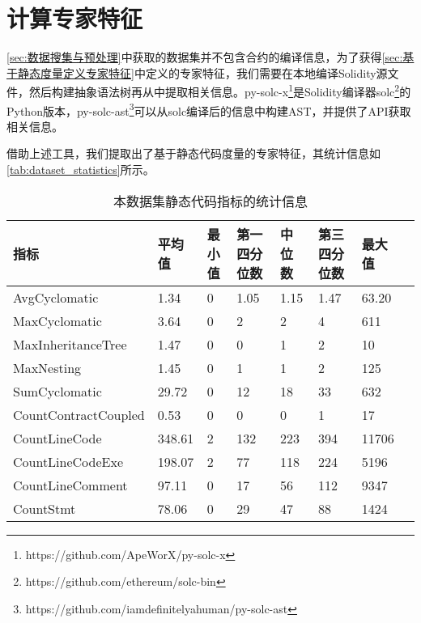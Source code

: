 \section{计算专家特征}
\label{sec:计算专家特征}
\autoref{sec:数据搜集与预处理}中获取的数据集并不包含合约的编译信息，为了获得\autoref{sec:基于静态度量定义专家特征}中定义的专家特征，我们需要在本地编译Solidity源文件，然后构建抽象语法树再从中提取相关信息。py-solc-x\footnote{https://github.com/ApeWorX/py-solc-x}是Solidity编译器solc\footnote{https://github.com/ethereum/solc-bin}的Python版本，py-solc-ast\footnote{https://github.com/iamdefinitelyahuman/py-solc-ast}可以从solc编译后的信息中构建AST，并提供了API获取相关信息。

借助上述工具，我们提取出了基于静态代码度量的专家特征，其统计信息如\autoref{tab:dataset_statistics}所示。
\begin{table}[htbp]
    \caption{\label{tab:dataset_statistics}本数据集静态代码指标的统计信息}
    \small
    \renewcommand{\arraystretch}{1.3}
    \begin{tabularx}{\linewidth}
        {p{3cm}<{\centering}X<{\centering}p{1.5cm}<{\centering}X<{\centering}X<{\centering}X<{\centering}X<{\centering}X<{\centering}}
    \hline
    \textbf{指标}                    & \textbf{平均值}   & \textbf{最小值} & \textbf{第一四分位数} & \textbf{中位数}  & \textbf{第三四分位数} & \textbf{最大值}   \\ \hline
    AvgCyclomatic         & 1.34        & 0   & 1.05   & 1.15 & 1.47   & 63.20 \\
    MaxCyclomatic         & 3.64        & 0   & 2      & 2    & 4      & 611   \\
    MaxInheritanceTree    & 1.47        & 0   & 0      & 1    & 2      & 10    \\
    MaxNesting            & 1.45        & 0   & 1      & 1    & 2      & 125   \\
    SumCyclomatic         & 29.72      & 0   & 12     & 18   & 33     & 632   \\
    CountContractCoupled  & 0.53        & 0   & 0      & 0    & 1      & 17    \\ \hline
    CountLineCode         & 348.61    & 2   & 132    & 223  & 394    & 11706 \\
    CountLineCodeExe      & 198.07    & 2   & 77     & 118  & 224    & 5196  \\
    CountLineComment      & 97.11     & 0   & 17     & 56   & 112    & 9347  \\
    CountStmt             & 78.06      & 0   & 29     & 47   & 88     & 1424  \\

\end{tabularx}
\end{table}
